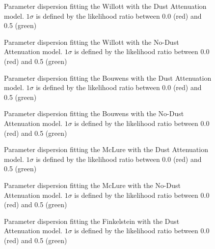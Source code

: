 \documentclass{emulateapj}
\begin{document}
\begin{figure}
\caption{Parameter dispersion fitting the Willott with the Dust Attenuation model. 
$1\sigma$ is defined by the likelihood ratio between 0.0 (red) and 0.5 (green)}
\label{fig:OD1_MCMC_best_steps_w}
\end{figure}

\begin{figure}
\caption{Parameter dispersion fitting the Willott with the No-Dust Attenuation model. 
$1\sigma$ is defined by the likelihood ratio between 0.0 (red) and 0.5 (green)}
\label{fig:OD1_MCMC_best_steps_wo}
\end{figure}

\begin{figure}
\caption{Parameter dispersion fitting the Bouwens with the Dust Attenuation model. 
$1\sigma$ is defined by the likelihood ratio between 0.0 (red) and 0.5 (green)}
\label{fig:OD2_MCMC_best_steps_w}
\end{figure}

\begin{figure}
\caption{Parameter dispersion fitting the Bouwens with the No-Dust Attenuation model. 
$1\sigma$ is defined by the likelihood ratio between 0.0 (red) and 0.5 (green)}
\label{fig:OD2_MCMC_best_steps_wo}
\end{figure}
\begin{figure}
\caption{Parameter dispersion fitting the McLure with the Dust Attenuation model. 
$1\sigma$ is defined by the likelihood ratio between 0.0 (red) and 0.5 (green)}
\label{fig:OD3_MCMC_best_steps_w}
\end{figure}

\begin{figure}
\caption{Parameter dispersion fitting the McLure with the No-Dust Attenuation model. 
$1\sigma$ is defined by the likelihood ratio between 0.0 (red) and 0.5 (green)}
\label{fig:OD3_MCMC_best_steps_wo}
\end{figure}
\begin{figure}
\caption{Parameter dispersion fitting the Finkelstein with the Dust Attenuation model. 
$1\sigma$ is defined by the likelihood ratio between 0.0 (red) and 0.5 (green)}
\label{fig:OD4_MCMC_best_steps_w}
\end{figure}
\end{document}
